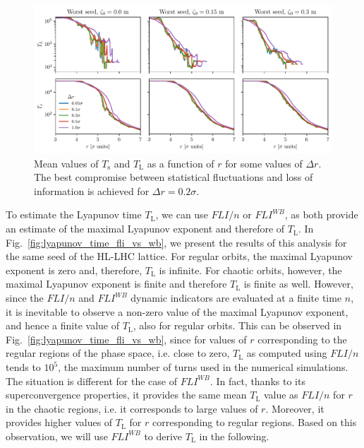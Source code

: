 \begin{figure}
    \centering
    \includegraphics[width=1\textwidth]{6_lhc_dynamic_indicators/figs/updated/lyapunov_time_vs_thickness.pdf}
    \caption{Mean values of $T_\mathrm{s}$ and $T_\mathrm{L}$ as a function of $r$ for some values of $\Delta r$. The best compromise between statistical fluctuations and loss of information is achieved for $\Delta r = 0.2\sigma$.}
    \label{fig:ts_vs_r0}
\end{figure}

To estimate the Lyapunov time $T_\mathrm{L}$, we can use $FLI/n$ or $FLI^{{WB}}$, as both provide an estimate of the maximal Lyapunov exponent and therefore of $T_\mathrm{L}$. In Fig.~\ref{fig:lyapunov_time_fli_vs_wb}, we present the results of this analysis for the same seed of the HL-LHC lattice. For regular orbits, the maximal Lyapunov exponent is zero and, therefore, $T_\mathrm{L}$ is infinite. For chaotic orbits, however, the maximal Lyapunov exponent is finite and therefore $T_\mathrm{L}$ is finite as well. However, since the $FLI/n$ and $FLI^{WB}$ dynamic indicators are evaluated at a finite time $n$, it is inevitable to observe a non-zero value of the maximal Lyapunov exponent, and hence a finite value of $T_\mathrm{L}$, also for regular orbits. This can be observed in Fig.~\ref{fig:lyapunov_time_fli_vs_wb}, since for values of $r$ corresponding to the regular regions of the phase space, i.e. close to zero, $T_\mathrm{L}$ as computed using $FLI/n$ tends to $10^5$, the maximum number of turns used in the numerical simulations. The situation is different for the case of $FLI^{{WB}}$. In fact, thanks to its superconvergence properties, it provides the same mean $T_\mathrm{L}$ value as $FLI/n$ for $r$ in the chaotic regions, i.e. it corresponds to large values of $r$. Moreover, it provides higher values of $T_\mathrm{L}$ for $r$ corresponding to regular regions. 
Based on this observation, we will use $FLI^{{WB}}$ to derive $T_\mathrm{L}$ in the following.

